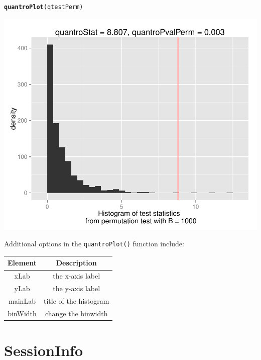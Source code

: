\documentclass{article}\usepackage[]{graphicx}\usepackage[usenames,dvipsnames]{color}
\makeatletter
\def\maxwidth{ %
  \ifdim\Gin@nat@width>\linewidth
    \linewidth
  \else
    \Gin@nat@width
  \fi
}
\newcommand{\hlstd}[1]{\textcolor[rgb]{0.345,0.345,0.345}{#1}}%
\newcommand{\hlkwd}[1]{\textcolor[rgb]{0.737,0.353,0.396}{\textbf{#1}}}%
\newenvironment{kframe}{%
 \def\at@end@of@kframe{}%
 \ifinner\ifhmode%
  \def\at@end@of@kframe{\end{minipage}}%
  \begin{minipage}{\columnwidth}%
 \fi\fi%
 \def\FrameCommand##1{\hskip\@totalleftmargin \hskip-\fboxsep
 \colorbox{shadecolor}{##1}\hskip-\fboxsep
     \hskip-\linewidth \hskip-\@totalleftmargin \hskip\columnwidth}%
 \MakeFramed {\advance\hsize-\width
   \@totalleftmargin\z@ \linewidth\hsize
   \@setminipage}}%
 {\par\unskip\endMakeFramed%
 \at@end@of@kframe}
\newenvironment{knitrout}{}{} %
\makeatother
\begin{document}
\begin{knitrout}
\color{fgcolor}\begin{kframe}
\begin{alltt}
\hlkwd{quantroPlot}\hlstd{(qtestPerm)}
\end{alltt}
\end{kframe}
\includegraphics[width=\maxwidth]{figure/quantro-plot} 

\end{knitrout}


Additional options in the \texttt{quantroPlot()} function include:

\begin{table}[h]
\begin{center}
\begin{tabular}{|c|c|}
\hline
Element & Description \\
\hline
xLab & the x-axis label \\
yLab & the y-axis label \\
mainLab & title of the histogram \\
binWidth & change the binwidth \\
\hline
\end{tabular}
\end{center}
\label{tab:plots}
\end{table}


\section{SessionInfo}
\end{document}
